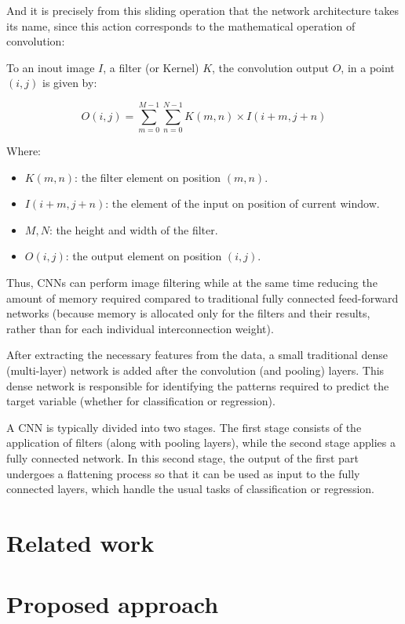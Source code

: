 \documentclass[sigconf,natbib=false]{acmart}
\begin{document}
And it is precisely from this sliding operation that the network architecture takes its name, since this action corresponds to the mathematical operation of convolution:

To an inout image \( I \), a filter (or Kernel) \( K \), the convolution output \( O \), in a point \( (i,j) \) is given by:

\[
O(i,j) = \sum_{m=0}^{M-1} \sum_{n=0}^{N-1} K(m,n) \times I(i+m, j+n)
\]

Where:

\begin{itemize}
\item \( K(m,n) \): the filter element on position \( (m,n) \).
\item \( I(i+m, j+n) \): the element of the input on position of current window.
\item \( M, N \): the height and width of the filter.
\item \( O(i,j) \): the output element on position \( (i,j) \).
\end{itemize}

Thus, CNNs can perform image filtering while at the same time reducing the amount of memory required compared to traditional fully connected feed-forward networks (because memory is allocated only for the filters and their results, rather than for each individual interconnection weight).

After extracting the necessary features from the data, a small traditional dense (multi-layer) network is added after the convolution (and pooling) layers. This dense network is responsible for identifying the patterns required to predict the target variable (whether for classification or regression).

A CNN is typically divided into two stages. The first stage consists of the application of filters (along with pooling layers), while the second stage applies a fully connected network. In this second stage, the output of the first part undergoes a flattening process so that it can be used as input to the fully connected layers, which handle the usual tasks of classification or regression.

\section{Related work}

\section{Proposed approach}
\end{document}
